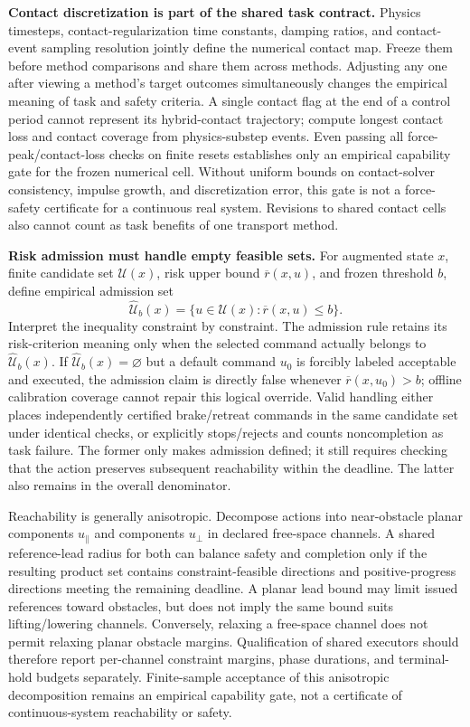 \textbf{Contact discretization is part of the shared task contract.} Physics timesteps, contact-regularization time constants,
damping ratios, and contact-event sampling resolution jointly define the numerical contact map. Freeze them before method comparisons
and share them across methods. Adjusting any one after viewing a method's target outcomes simultaneously changes the empirical meaning
of task and safety criteria. A single contact flag at the end of a control period cannot represent
its hybrid-contact trajectory; compute longest contact loss and contact coverage from physics-substep events.
Even passing all force-peak/contact-loss checks on finite resets establishes only an empirical capability gate
for the frozen numerical cell. Without uniform bounds on contact-solver consistency, impulse growth, and discretization error,
this gate is not a force-safety certificate for a continuous real system. Revisions to shared contact cells also cannot count
as task benefits of one transport method.

\textbf{Risk admission must handle empty feasible sets.} For augmented state $x$, finite candidate set
$\mathcal U(x)$, risk upper bound $\overline r(x,u)$, and frozen threshold $b$, define empirical admission set
\[
 \widehat{\mathcal U}_{b}(x)
 =\{u\in\mathcal U(x):\overline r(x,u)\le b\}.
\]
Interpret the inequality constraint by constraint. The admission rule retains its risk-criterion meaning only when the selected command
actually belongs to $\widehat{\mathcal U}_{b}(x)$.
If $\widehat{\mathcal U}_{b}(x)=\varnothing$ but a default command $u_0$ is forcibly labeled
acceptable and executed, the admission claim is directly false whenever $\overline r(x,u_0)>b$;
offline calibration coverage cannot repair this logical override. Valid handling either places independently certified
brake/retreat commands in the same candidate set under identical checks, or explicitly stops/rejects and counts noncompletion
as task failure. The former only makes admission defined; it still requires checking that the action preserves subsequent
reachability within the deadline. The latter also remains in the overall denominator.

Reachability is generally anisotropic. Decompose actions into near-obstacle planar components
$u_{\parallel}$ and components $u_{\perp}$ in declared free-space channels. A shared reference-lead radius for both can balance
safety and completion only if the resulting product set contains constraint-feasible directions and positive-progress directions
meeting the remaining deadline. A planar lead bound may limit issued references toward obstacles,
but does not imply the same bound suits lifting/lowering channels. Conversely, relaxing a free-space channel does not permit
relaxing planar obstacle margins. Qualification of shared executors should therefore report per-channel constraint margins, phase
durations, and terminal-hold budgets separately. Finite-sample acceptance of this anisotropic decomposition remains an empirical capability gate,
not a certificate of continuous-system reachability or safety.

